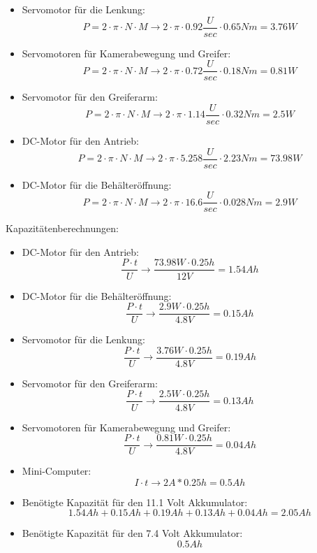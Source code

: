\begin{itemize}
\item Servomotor für die Lenkung:
\[
P=2\cdot \pi\cdot N\cdot M \to 2\cdot \pi\cdot 0.92\frac{U}{sec}\cdot 0.65Nm = 3.76W
\]
\item Servomotoren für Kamerabewegung und Greifer:
\[
P=2\cdot \pi\cdot N\cdot M \to 2\cdot \pi\cdot 0.72\frac{U}{sec}\cdot 0.18Nm = 0.81W
\]
\item Servomotor für den Greiferarm:
\[
P=2\cdot \pi\cdot N\cdot M \to 2\cdot \pi\cdot 1.14\frac{U}{sec}\cdot 0.32Nm = 2.5W
\]
\item DC-Motor für den Antrieb:
\[
P=2\cdot \pi\cdot N\cdot M \to 2\cdot \pi\cdot 5.258\frac{U}{sec}\cdot 2.23Nm = 73.98W
\]
\item DC-Motor für die Behälteröffnung:
\[
P=2\cdot \pi\cdot N\cdot M \to 2\cdot \pi\cdot 16.6\frac{U}{sec}\cdot 0.028Nm = 2.9W
\]
\end{itemize}
\newpage
Kapazitätenberechnungen:
\begin{itemize}
\item DC-Motor für den Antrieb:
\[
\frac{P\cdot t}{U} \to \frac{73.98W\cdot0.25h}{12V}= 1.54 Ah
\]
\item DC-Motor für die Behälteröffnung:
\[
\frac{P\cdot t}{U} \to \frac{2.9W\cdot0.25h}{4.8V}= 0.15 Ah
\]
\item Servomotor für die Lenkung:
\[
\frac{P\cdot t}{U} \to \frac{3.76W\cdot0.25h}{4.8V}= 0.19 Ah
\]
\item Servomotor für den Greiferarm:
\[
\frac{P\cdot t}{U} \to \frac{2.5W\cdot0.25h}{4.8V}= 0.13 Ah
\]
\item Servomotoren für Kamerabewegung und Greifer:
\[
\frac{P\cdot t}{U} \to \frac{0.81W\cdot0.25h}{4.8V}= 0.04 Ah
\]
\item Mini-Computer:
\[
I\cdot t \to 2A*0.25h = 0.5 Ah
\]
\item Benötigte Kapazität für den 11.1 Volt Akkumulator:
\[
1.54Ah+0.15Ah+0.19Ah+0.13Ah+0.04Ah = 2.05Ah
\]
\item Benötigte Kapazität für den 7.4 Volt Akkumulator:
\[
0.5Ah
\]
\end{itemize}
